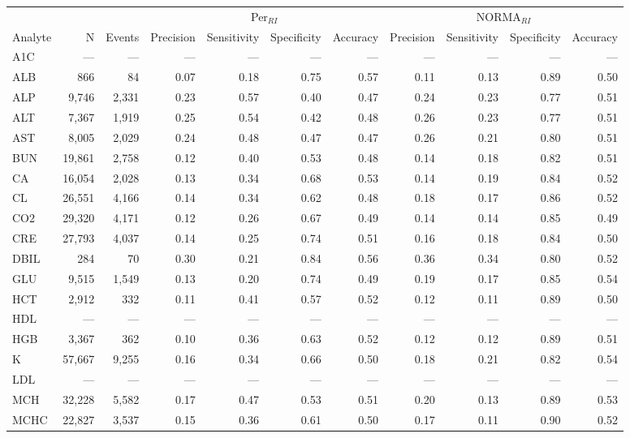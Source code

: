 \begin{table}[ht]
\centering
\footnotesize
\begin{tabular}{lrrrrrrrrrr}
\toprule
 & &  & \multicolumn{4}{c}{Per$_{RI}$} & \multicolumn{4}{c}{NORMA$_{RI}$} \\
\cmidrule(lr){4-7} \cmidrule(lr){8-11}
Analyte & N & Events & Precision & Sensitivity & Specificity & Accuracy & Precision & Sensitivity & Specificity & Accuracy \\
\midrule
A1C & --- & --- & --- & --- & --- & --- & --- & --- & --- & --- \\
ALB & 866 & 84 & 0.07 & 0.18 & 0.75 & 0.57 & 0.11 & 0.13 & 0.89 & 0.50 \\
ALP & 9,746 & 2,331 & 0.23 & 0.57 & 0.40 & 0.47 & 0.24 & 0.23 & 0.77 & 0.51 \\
ALT & 7,367 & 1,919 & 0.25 & 0.54 & 0.42 & 0.48 & 0.26 & 0.23 & 0.77 & 0.51 \\
AST & 8,005 & 2,029 & 0.24 & 0.48 & 0.47 & 0.47 & 0.26 & 0.21 & 0.80 & 0.51 \\
BUN & 19,861 & 2,758 & 0.12 & 0.40 & 0.53 & 0.48 & 0.14 & 0.18 & 0.82 & 0.51 \\
CA & 16,054 & 2,028 & 0.13 & 0.34 & 0.68 & 0.53 & 0.14 & 0.19 & 0.84 & 0.52 \\
CL & 26,551 & 4,166 & 0.14 & 0.34 & 0.62 & 0.48 & 0.18 & 0.17 & 0.86 & 0.52 \\
CO2 & 29,320 & 4,171 & 0.12 & 0.26 & 0.67 & 0.49 & 0.14 & 0.14 & 0.85 & 0.49 \\
CRE & 27,793 & 4,037 & 0.14 & 0.25 & 0.74 & 0.51 & 0.16 & 0.18 & 0.84 & 0.50 \\
DBIL & 284 & 70 & 0.30 & 0.21 & 0.84 & 0.56 & 0.36 & 0.34 & 0.80 & 0.52 \\
GLU & 9,515 & 1,549 & 0.13 & 0.20 & 0.74 & 0.49 & 0.19 & 0.17 & 0.85 & 0.54 \\
HCT & 2,912 & 332 & 0.11 & 0.41 & 0.57 & 0.52 & 0.12 & 0.11 & 0.89 & 0.50 \\
HDL & --- & --- & --- & --- & --- & --- & --- & --- & --- & --- \\
HGB & 3,367 & 362 & 0.10 & 0.36 & 0.63 & 0.52 & 0.12 & 0.12 & 0.89 & 0.51 \\
K & 57,667 & 9,255 & 0.16 & 0.34 & 0.66 & 0.50 & 0.18 & 0.21 & 0.82 & 0.54 \\
LDL & --- & --- & --- & --- & --- & --- & --- & --- & --- & --- \\
MCH & 32,228 & 5,582 & 0.17 & 0.47 & 0.53 & 0.51 & 0.20 & 0.13 & 0.89 & 0.53 \\
MCHC & 22,827 & 3,537 & 0.15 & 0.36 & 0.61 & 0.50 & 0.17 & 0.11 & 0.90 & 0.52 \\

\end{tabular}
\end{table}
